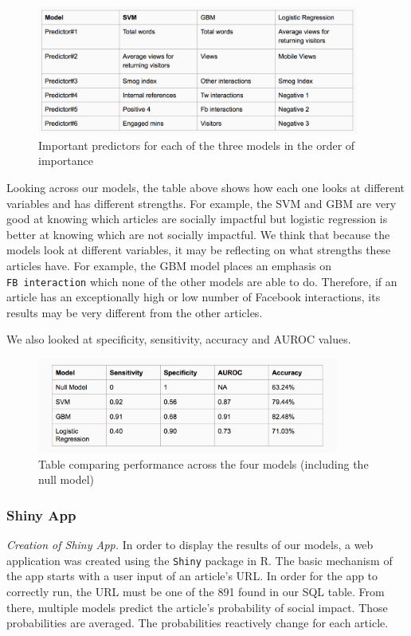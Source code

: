\documentclass[10pt,letterpaper]{article}
\begin{document}
\begin{figure}
\includegraphics[width=400px]{model-comp-II} \caption{Important predictors for each of the three models in the order of importance}\label{fig:unnamed-chunk-5}
\end{figure}

Looking across our models, the table above shows how each one looks at
different variables and has different strengths. For example, the SVM
and GBM are very good at knowing which articles are socially impactful
but logistic regression is better at knowing which are not socially
impactful. We think that because the models look at different variables,
it may be reflecting on what strengths these articles have. For example,
the GBM model places an emphasis on \texttt{FB\ interaction} which none
of the other models are able to do. Therefore, if an article has an
exceptionally high or low number of Facebook interactions, its results
may be very different from the other articles.

We also looked at specificity, sensitivity, accuracy and AUROC values.

\begin{figure}
\includegraphics[width=375px]{model-comp} \caption{Table comparing performance across the four models (including the null model)}\label{fig:unnamed-chunk-6}
\end{figure}

\hypertarget{shiny-app}{%
\subsubsection{Shiny App}\label{shiny-app}}

\emph{Creation of Shiny App.} In order to display the results of our
models, a web application was created using the \texttt{Shiny} package
in R. The basic mechanism of the app starts with a user input of an
article's URL. In order for the app to correctly run, the URL must be
one of the 891 found in our SQL table. From there, multiple models
predict the article's probability of social impact. Those probabilities
are averaged. The probabilities reactively change for each article.
\end{document}
